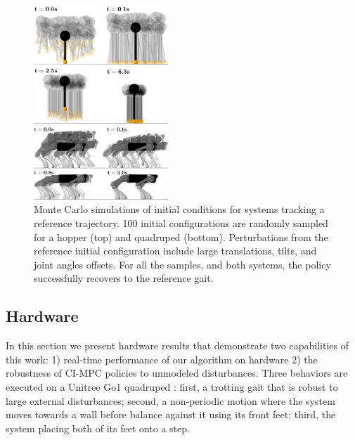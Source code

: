 \begin{figure}[t]
	\begin{center}
		\includegraphics[width=0.45\textwidth]{ci_pc/hopper_2D_monte_carlo.png}
	\end{center}
	\begin{center}
		\includegraphics[width=0.45\textwidth]{ci_pc/quadruped_monte_carlo.png}
	\end{center}
	\caption[Monte Carlo CI-MPC policy test for hopper and planar quadruped]{Monte Carlo simulations of initial conditions for systems tracking a reference trajectory. 100 initial configurations are randomly sampled for a hopper (top) and quadruped (bottom). Perturbations from the reference initial configuration include large translations, tilts, and joint angles offsets. For all the samples, and both systems, the policy successfully recovers to the reference gait.}
	\label{cipc_monte_carlo}
\end{figure}

\subsection{Hardware}
In this section we present hardware results that demonstrate two capabilities of this work: 1) real-time performance of our algorithm on hardware 2) the robustness of CI-MPC policies to unmodeled disturbances. Three behaviors are executed on a Unitree Go1 quadruped \cite{unitree_go1}: first, a trotting gait that is robust to large external disturbances; second, a non-periodic motion where the system moves towards a wall before balance against it using its front feet; third, the system placing both of its feet onto a step.

